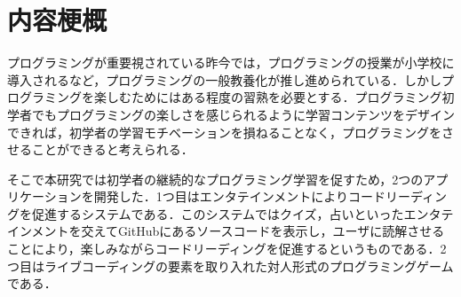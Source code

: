 \section*{内容梗概}


プログラミングが重要視されている昨今では，プログラミングの授業が小学校に導入されるなど，プログラミングの一般教養化が推し進められている．しかしプログラミングを楽しむためにはある程度の習熟を必要とする．プログラミング初学者でもプログラミングの楽しさを感じられるように学習コンテンツをデザインできれば，初学者の学習モチベーションを損ねることなく，プログラミングをさせることができると考えられる．

そこで本研究では初学者の継続的なプログラミング学習を促すため，2つのアプリケーションを開発した．1つ目はエンタテインメントによりコードリーディングを促進するシステムである．このシステムではクイズ，占いといったエンタテインメントを交えてGitHubにあるソースコードを表示し，ユーザに読解させることにより，楽しみながらコードリーディングを促進するというものである．2つ目はライブコーディングの要素を取り入れた対人形式のプログラミングゲームである．